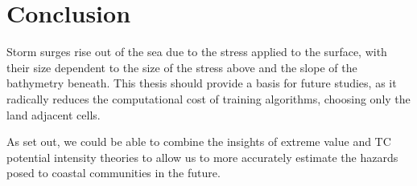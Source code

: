 \section{Conclusion}
\label{sec:8_Conclusion}

Storm surges rise out of the sea due to the stress applied to the surface,
with their size dependent to the size of the stress above and
the slope of the bathymetry beneath.
This thesis should provide a basis for
future studies, as it radically reduces the computational cost
of training algorithms, choosing only the
land adjacent cells.

As set out, we could be able to combine the insights of
extreme value and TC potential intensity theories to allow
us to more accurately estimate the hazards posed to coastal communities
in the future.
